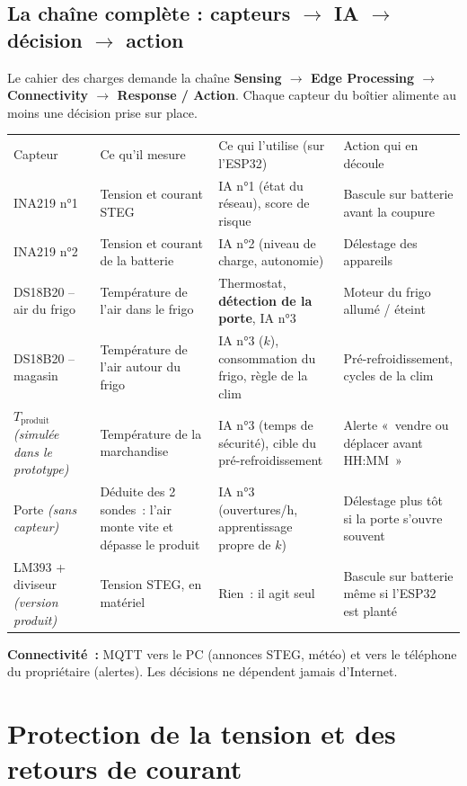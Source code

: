 \documentclass[10pt,a4paper]{article}
\begin{document}
\subsection{La chaîne complète : capteurs $\rightarrow$ IA $\rightarrow$ décision $\rightarrow$ action}
Le cahier des charges demande la chaîne \textbf{Sensing $\rightarrow$ Edge Processing $\rightarrow$ Connectivity $\rightarrow$ Response / Action}. Chaque capteur du boîtier alimente au moins une décision prise sur place.

\begin{tabularx}{\linewidth}{Q{2.9cm}P{3.6cm}LP{3.2cm}}
 Capteur & \mdseries Ce qu'il mesure & \mdseries Ce qui l'utilise (sur l'ESP32) & \mdseries Action qui en découle \\
INA219 n°1 & Tension et courant STEG & IA n°1 (état du réseau), score de risque & Bascule sur batterie avant la coupure \\
INA219 n°2 & Tension et courant de la batterie & IA n°2 (niveau de charge, autonomie) & Délestage des appareils \\
DS18B20 -- air du frigo & Température de l'air dans le frigo & Thermostat, \textbf{détection de la porte}, IA n°3 & Moteur du frigo allumé / éteint \\
DS18B20 -- magasin & Température de l'air autour du frigo & IA n°3 ($k$), consommation du frigo, règle de la clim & Pré-refroidissement, cycles de la clim \\
$T_{\text{produit}}$ \textit{(simulée dans le prototype)} & Température de la marchandise & IA n°3 (temps de sécurité), cible du pré-refroidissement & Alerte «~vendre ou déplacer avant HH:MM~» \\
Porte \textit{(sans capteur)} & Déduite des 2 sondes~: l'air monte vite et dépasse le produit & IA n°3 (ouvertures/h, apprentissage propre de $k$) & Délestage plus tôt si la porte s'ouvre souvent \\
LM393 + diviseur \textit{(version produit)} & Tension STEG, en matériel & Rien~: il agit seul & Bascule sur batterie même si l'ESP32 est planté \\
\end{tabularx}

\textbf{Connectivité~:} MQTT vers le PC (annonces STEG, météo) et vers le téléphone du propriétaire (alertes). Les décisions ne dépendent jamais d'Internet.

\section{Protection de la tension et des retours de courant}
\end{document}
